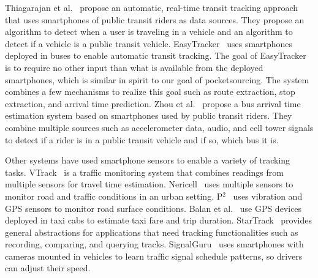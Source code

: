 Thiagarajan et al.~\cite{Thiagarajan:2010:CTT} propose an automatic, real-time
transit tracking approach that uses smartphones of public transit riders as data
sources. They propose an algorithm to detect when a user is traveling in a
vehicle and an algorithm to detect if a vehicle is a public transit vehicle.
EasyTracker~\cite{Biagioni:2011:EAT} uses smartphones deployed in buses to
enable automatic transit tracking. The goal of EasyTracker is to require no
other input than what is available from the deployed smartphones, which is
similar in spirit to our goal of pocketsourcing. The system combines a few
mechanisms to realize this goal such as route extraction, stop extraction, and
arrival time prediction. Zhou et al.~\cite{Zhou:2012:LWP} propose a bus arrival
time estimation system based on smartphones used by public transit riders. They
combine multiple sources such as accelerometer data, audio, and cell tower
signals to detect if a rider is in a public transit vehicle and if so, which bus
it is.

Other systems have used smartphone sensors to enable a variety of tracking
tasks. VTrack~\cite{Thiagarajan:2009:VAE} is a traffic monitoring system that
combines readings from multiple sensors for travel time estimation.
Nericell~\cite{Mohan:2008:NRM} uses multiple sensors to monitor road and traffic
conditions in an urban setting. P$^{2}$~\cite{Eriksson:2008:PPU} uses vibration
and GPS sensors to monitor road surface conditions. Balan et
al.~\cite{Balan:2011:RTI} use GPS devices deployed in taxi cabs to estimate
taxi fare and trip duration. StarTrack~\cite{Ananthanarayanan:2009:SFE,
Haridasan:2010:SNG} provides general abstractions for applications that need
tracking functionalities such as recording, comparing, and querying tracks.
SignalGuru~\cite{Koukoumidis:2011:SLM} uses smartphones with cameras mounted in
vehicles to learn traffic signal schedule patterns, so drivers can adjust their
speed.
